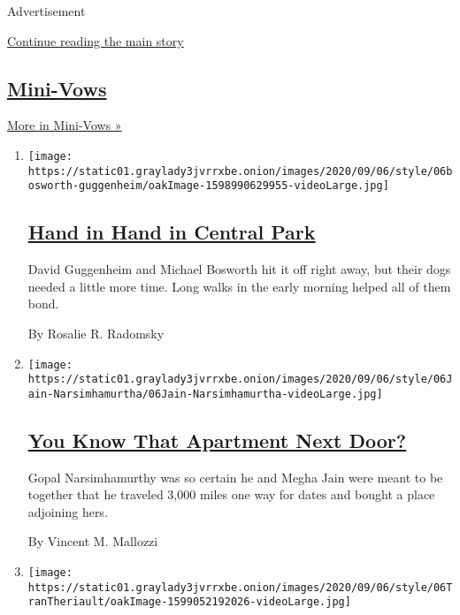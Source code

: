 Advertisement

\protect\hyperlink{after-mid1}{Continue reading the main story}

\hypertarget{mini-vows}{%
\subsection{\texorpdfstring{\href{/column/mini-vows}{Mini-Vows}}{Mini-Vows}}\label{mini-vows}}

\href{/column/mini-vows}{More in Mini-Vows »}

\begin{enumerate}
\def\labelenumi{\arabic{enumi}.}
\item
  \texttt{[image: https://static01.graylady3jvrrxbe.onion/images/2020/09/06/style/06bosworth-guggenheim/oakImage-1598990629955-videoLarge.jpg]}

  \hypertarget{hand-in-hand-in-central-park}{%
  \subsection{\texorpdfstring{\href{/2020/09/04/style/hand-in-hand-in-central-park.html}{Hand
  in Hand in Central
  Park}}{Hand in Hand in Central Park}}\label{hand-in-hand-in-central-park}}

  David Guggenheim and Michael Bosworth hit it off right away, but their
  dogs needed a little more time. Long walks in the early morning helped
  all of them bond.

  By Rosalie R. Radomsky
\item
  \texttt{[image: https://static01.graylady3jvrrxbe.onion/images/2020/09/06/style/06Jain-Narsimhamurtha/06Jain-Narsimhamurtha-videoLarge.jpg]}

  \hypertarget{you-know-that-apartment-next-door}{%
  \subsection{\texorpdfstring{\href{/2020/09/04/fashion/weddings/you-know-that-apartment-next-door.html}{You
  Know That Apartment Next
  Door?}}{You Know That Apartment Next Door?}}\label{you-know-that-apartment-next-door}}

  Gopal Narsimhamurthy was so certain he and Megha Jain were meant to be
  together that he traveled 3,000 miles one way for dates and bought a
  place adjoining hers.

  By Vincent M. Mallozzi
\item
  \texttt{[image: https://static01.graylady3jvrrxbe.onion/images/2020/09/06/style/06TranTheriault/oakImage-1599052192026-videoLarge.jpg]}


\end{enumerate}
